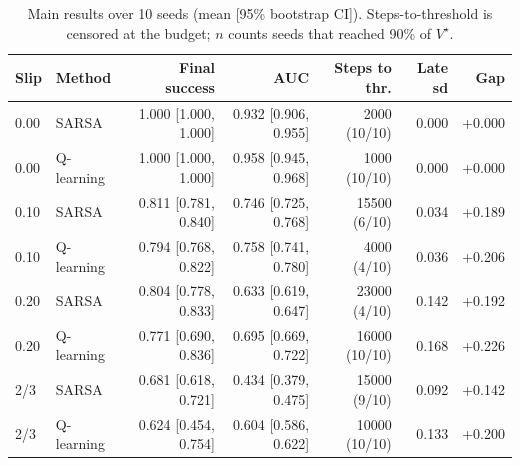 \begin{table}[t]
\centering
\small
\caption{Main results over 10 seeds (mean [95\% bootstrap CI]). Steps-to-threshold is censored at the budget; $n$ counts seeds that reached 90\% of $V^\star$.}
\label{tab:main}
\begin{tabular}{llrrrrr}
\toprule
Slip & Method & Final success & AUC & Steps to thr. & Late sd & Gap \\
\midrule
0.00 & SARSA & 1.000 [1.000, 1.000] & 0.932 [0.906, 0.955] & 2000 (10/10) & 0.000 & +0.000 \\
0.00 & Q-learning & 1.000 [1.000, 1.000] & 0.958 [0.945, 0.968] & 1000 (10/10) & 0.000 & +0.000 \\
\midrule
0.10 & SARSA & 0.811 [0.781, 0.840] & 0.746 [0.725, 0.768] & 15500 (6/10) & 0.034 & +0.189 \\
0.10 & Q-learning & 0.794 [0.768, 0.822] & 0.758 [0.741, 0.780] & 4000 (4/10) & 0.036 & +0.206 \\
\midrule
0.20 & SARSA & 0.804 [0.778, 0.833] & 0.633 [0.619, 0.647] & 23000 (4/10) & 0.142 & +0.192 \\
0.20 & Q-learning & 0.771 [0.690, 0.836] & 0.695 [0.669, 0.722] & 16000 (10/10) & 0.168 & +0.226 \\
\midrule
2/3 & SARSA & 0.681 [0.618, 0.721] & 0.434 [0.379, 0.475] & 15000 (9/10) & 0.092 & +0.142 \\
2/3 & Q-learning & 0.624 [0.454, 0.754] & 0.604 [0.586, 0.622] & 10000 (10/10) & 0.133 & +0.200 \\

\bottomrule
\end{tabular}
\end{table}